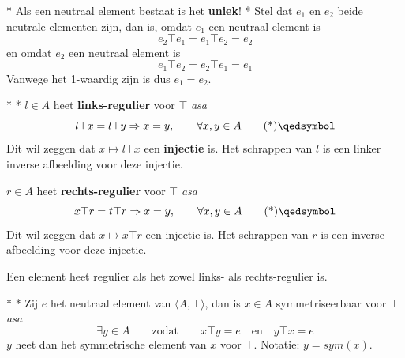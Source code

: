 \begin{nicetheorem}*\label{H2_e_uniek}
    Als een neutraal element bestaat is het \textcolor{red!75!black}{\textbf{uniek}}!
    \nextpart[Bewijs.]*
    Stel dat $e_1$ en $e_2$ beide neutrale elementen zijn, dan is, omdat $e_1$ een neutraal element is
    \begin{equation*}
        e_2 \top e_1 = e_1 \top e_2 = e_2
    \end{equation*}
    en omdat $e_2$ een neutraal element is
    \begin{equation*}
        e_1 \top e_2 = e_2 \top e_1 = e_1
    \end{equation*}
    Vanwege het 1-waardig zijn is dus $e_1 = e_2$.
\end{nicetheorem}


\begin{nicedefinition}*
    \nextpart[]*
    $l \in A$ heet \textcolor{PineGreen!75!black}{\textbf{links-regulier}} voor $\top$ \emph{asa}
    \begin{equation}
        l \top x = l \top y \Rightarrow x = y, \qquad \forall x, y \in A \qedtag
    \end{equation}
    Dit wil zeggen dat $x \mapsto l \top x$ een \textbf{injectie} is. Het schrappen van $l$ is een linker inverse afbeelding voor deze injectie.

    \vspace{0.5cm}

    $r \in A$ heet \textcolor{PineGreen!75!black}{\textbf{rechts-regulier}} voor $\top$ \emph{asa}
    \begin{equation}
        x \top r = t \top r \Rightarrow x = y, \qquad \forall x, y \in A \qedtag
    \end{equation}
    Dit wil zeggen dat $x \mapsto x \top r$ een injectie is. Het schrappen van $r$ is een \textbf{} inverse afbeelding voor deze injectie.

    \vspace{0.5cm}

    Een element heet regulier als het zowel links- als rechts-regulier is.
\end{nicedefinition}

\begin{nicedefinition}*
    \nextpart[]*
    Zij $e$ het neutraal element van $\langle A, \top \rangle$, dan is $x\in A$ symmetriseerbaar voor $\top$ \emph{asa}
    \begin{equation}
        \exists y \in A \qquad \text{zodat} \qquad x \top y = e \quad \text{en} \quad y \top x = e
    \end{equation}
    $y$ heet dan het symmetrische element van $x$ voor $\top$. Notatie: $y = sym(x)$.
\end{nicedefinition}

